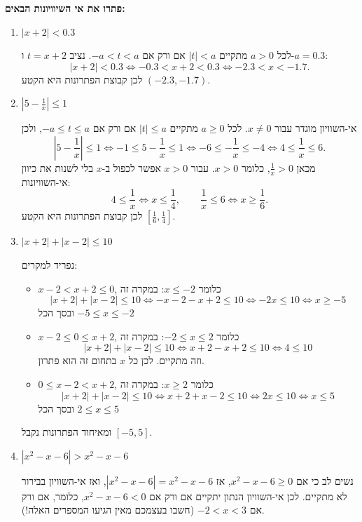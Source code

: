 \textbf{פתרו את אי השיוויונות הבאים:}
\begin{enumerate}
\item  $|x + 2| < 0.3$
\begin{solbox}
לכל $a>0$ מתקיים
$|t|<a$
אם ורק אם
$-a<t<a$.
נציב $t=x+2$ ו-$a=0.3$:
$$|x+2|<0.3\Longleftrightarrow-0.3<x+2<0.3\Longleftrightarrow-2.3<x<-1.7.$$
לכן קבוצת הפתרונות היא הקטע
$(-2.3,-1.7)$.
\end{solbox}
\item $|5 - \frac{1}{x}| \leq 1$
\begin{solbox}
אי-השוויון מוגדר עבור $x\neq0$.
לכל $a\ge0$ מתקיים
$|t|\le a$
אם ורק אם
$-a\le t\le a$,
ולכן
$$\left|5-\frac1x\right|\le1\Longleftrightarrow-1\le5-\frac1x\le1\Longleftrightarrow-6\le-\frac1x\le-4\Longleftrightarrow4\le\frac1x\le6.$$
מכאן $\frac1x>0$, כלומר $x>0$.
עבור $x>0$ אפשר לכפול ב-$x$ בלי לשנות את כיוון אי-השוויונות:
$$4\le\frac1x\Longleftrightarrow x\le\frac14,\qquad\frac1x\le6\Longleftrightarrow x\ge\frac16.$$
לכן קבוצת הפתרונות היא הקטע
$\left[\frac16,\frac14\right]$.
\end{solbox}
\item $|x + 2| + |x - 2| \leq 10$
\begin{solbox}
נפריד למקרים:
\begin{itemize}
\item
$x - 2 < x + 2 \leq 0$,
כלומר
$x \leq -2$:
במקרה זה
$$|x + 2| + |x - 2| \leq 10 \Longleftrightarrow -x -2 -x +2 \leq 10 \Longleftrightarrow -2x \leq 10 \Longleftrightarrow x \geq -5$$
ובסך הכל
$ -5 \leq x \leq -2$
\item
$x - 2 \leq 0 \leq x + 2 $,
כלומר
$-2 \leq x \leq 2$:
במקרה זה
$$|x + 2| + |x - 2| \leq 10 \Longleftrightarrow x + 2 -x +2 \leq 10 \Longleftrightarrow 4 \leq 10 $$
וזה מתקיים. לכן כל $x$ בתחום זה הוא פתרון.
\item
$0 \leq x - 2 < x + 2 $,
כלומר
$x \geq 2$:
במקרה זה
$$|x + 2| + |x - 2| \leq 10 \Longleftrightarrow x + 2 + x - 2 \leq 10 \Longleftrightarrow 2x \leq 10 \Longleftrightarrow x \leq 5$$
ובסך הכל
$ 2 \leq x \leq 5$
\end{itemize}
ומאיחוד הפתרונות נקבל
$[-5, 5]$.
\end{solbox}
\item $|x^2-x-6|>x^2-x-6$
\begin{solbox}
נשים לב כי אם
$x^2-x-6\geq0$,
אז
$|x^2-x-6|=x^2-x-6$,
ואז אי-השוויון בבירור לא מתקיים. לכן אי-השוויון הנתון יתקיים אם ורק אם
$x^2-x-6<0$,
כלומר, אם ורק אם
$-2<x<3$
(חשבו בעצמכם מאין הגיעו המספרים האלה!).
\end{solbox}
\eMs
\end{enumerate}
